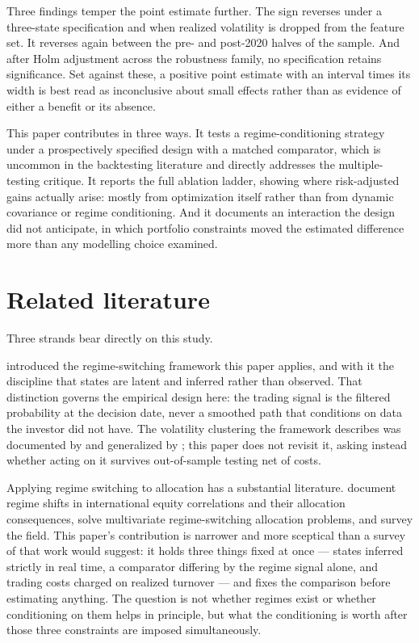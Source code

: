 Three findings temper the point estimate further. The sign reverses
under a three-state specification and when realized volatility is
dropped from the feature set. It reverses again between the pre- and
post-2020 halves of the sample. And after Holm adjustment across the
robustness family, no specification retains significance. Set against
these, a positive point estimate with an interval \ciWidthMultiple{} times
its width is best read as inconclusive about small effects rather than as evidence
of either a benefit or its absence.

This paper contributes in three ways. It tests a regime-conditioning
strategy under a prospectively specified design with a matched comparator, which
is uncommon in the backtesting literature and directly addresses the
multiple-testing critique. It reports the full ablation ladder, showing
where risk-adjusted gains actually arise: mostly from optimization
itself rather than from dynamic covariance or regime conditioning. And
it documents an interaction the design did not anticipate, in which
portfolio constraints moved the estimated difference more than any
modelling choice examined.

\section{Related literature}
\label{sec:literature}

Three strands bear directly on this study.

\citet{hamilton1989} introduced the regime-switching framework this
paper applies, and with it the discipline that states are latent and
inferred rather than observed. That distinction governs the empirical
design here: the trading signal is the filtered probability at the
decision date, never a smoothed path that conditions on data the
investor did not have. The volatility clustering the framework describes
was documented by \citet{engle1982} and generalized by
\citet{bollerslev1986}; this paper does not revisit it, asking instead
whether acting on it survives out-of-sample testing net of costs.

Applying regime switching to allocation has a substantial literature.
\citet{ang2002} document regime shifts in international equity
correlations and their allocation consequences, \citet{guidolin2007}
solve multivariate regime-switching allocation problems, and
\citet{ang2012} survey the field. This paper's contribution is narrower
and more sceptical than a survey of that work would suggest: it holds
three things fixed at once --- states inferred strictly in real time, a
comparator differing by the regime signal alone, and trading costs
charged on realized turnover --- and fixes the comparison before
estimating anything. The question is not whether regimes exist or
whether conditioning on them helps in principle, but what the
conditioning is worth after those three constraints are imposed
simultaneously.

